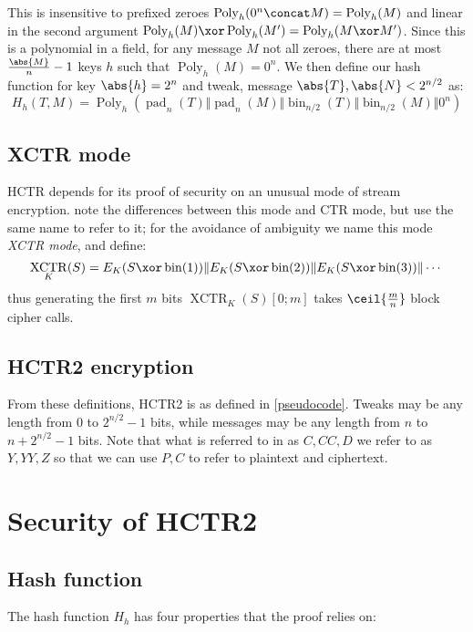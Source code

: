\documentclass[letterpaper,11pt]{article}
\newcommand*{\Concat}{\Vert}
\DeclareMathOperator{\XCTR}{XCTR}
\DeclareMathOperator{\fromint}{bin}
\DeclareMathOperator{\pad}{pad}
\DeclareMathOperator{\Poly}{Poly}
\begin{document}
This is insensitive to prefixed zeroes \(\Poly_h(0^n \concat M) = \Poly_h(M)\)
and linear in the second argument \(\Poly_h(M) \xor \Poly_h(M') = \Poly_h(M \xor M')\).
Since this is a polynomial in a field,
for any message \(M\) not all zeroes, there are at most \(\frac{\abs{M}}{n} -1\)
keys \(h\) such that \(\Poly_h(M) = 0^n\). We then define our hash function for key \(\abs{h} = 2^n\)
and tweak, message \(\abs{T}, \abs{N} < 2^{n/2}\) as:
\begin{displaymath}
    H_h(T, M) = \Poly_h(\pad_n(T) \Concat \pad_n(M) \Concat \fromint_{n/2}(T) \Concat \fromint_{n/2}(M) \Concat 0^n)
\end{displaymath}

\subsection{XCTR mode}

HCTR depends for its proof of security
on an unusual mode of stream encryption.
\cite{hctr,hctr2} note the differences between this mode and CTR mode,
but use the same name to refer to it; for the avoidance of ambiguity
we name this mode \emph{XCTR mode}, and define:
\begin{displaymath}
    \XCTR_K(S) = E_K(S \xor \fromint(1)) \Concat E_K(S \xor \fromint(2)) \Concat E_K(S \xor \fromint(3)) \Concat \cdots
\end{displaymath}
thus generating the first \(m\) bits \(\XCTR_K(S)[0; m]\) takes \(\ceil{\frac{m}{n}}\) block cipher calls.

\subsection{HCTR2 encryption}

From these definitions, HCTR2 is as defined in \autoref{pseudocode}.
Tweaks may be any length from 0 to \(2^{n/2}-1\) bits, while
messages may be any length from \(n\) to \(n + 2^{n/2}-1\) bits.
Note that what is referred to in \cite{hctr,hctr2} as \(C, \mathit{CC}, D\)
we refer to as \(Y, YY, Z\)
so that we can use \(P, C\) to refer to plaintext and ciphertext.

\section{Security of HCTR2}

\subsection{Hash function}
The hash function \(H_h\) has four properties that the proof relies on:
\end{document}
